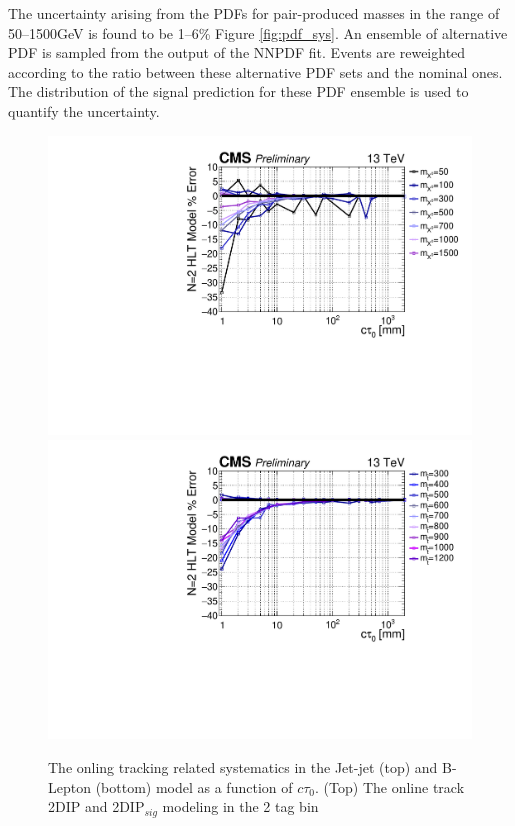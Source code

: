 The uncertainty arising from the PDFs for pair-produced masses in the
range of 50--1500GeV is found to be 1--6\% Figure \ref{fig:pdf_sys}.  An ensemble of
alternative PDF is sampled from the output of the NNPDF fit.  Events
are reweighted according to the ratio between these alternative PDF
sets and the nominal ones. The distribution of the signal prediction
for these PDF ensemble is used to quantify the uncertainty.

\begin{figure}
\begin{center}
\includegraphics[width=.70\textwidth]{figures/an/SYSTEMATICS/76x_pu/sys_2tag_hlt.pdf}
\includegraphics[width=.70\textwidth]{figures/an/SYSTEMATICS/76x_pu/sys_2tag_hlt_dsusy.pdf}
\caption{The onling tracking related systematics in the Jet-jet (top) and B-Lepton
 (bottom)  model as a function of $c\tau_0$. (Top) The online track 2DIP and
 2DIP$_{sig}$ modeling in the 2 tag bin   \label{fig:online_tracking_sys}}
\end{center}
\end{figure}


